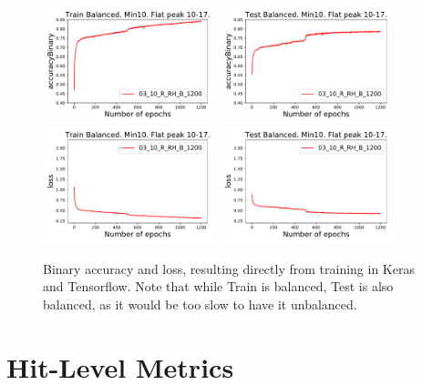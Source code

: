 \begin{figure}[t]
\centering
\includegraphics[width=0.45\textwidth]{plots/plot_01_1_overlay_graph_accuracyBinary_Train.pdf}
\includegraphics[width=0.45\textwidth]{plots/plot_01_1_overlay_graph_accuracyBinary_Test.pdf}\\
\includegraphics[width=0.45\textwidth]{plots/plot_01_1_overlay_graph_loss_Train.pdf}
\includegraphics[width=0.45\textwidth]{plots/plot_01_1_overlay_graph_loss_Test.pdf}\\
\caption{Binary accuracy and loss, resulting directly from training in Keras and Tensorflow. Note that while Train is balanced, Test is also balanced, as it would be too slow to have it unbalanced.}
\label{fig:AccuracyLoss}
\end{figure}

\section{Hit-Level Metrics}
\label{sec:HitLevelMetrics}

